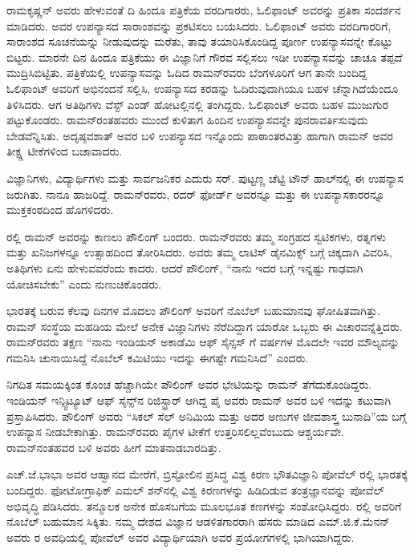 ರಾಮಕೃಷ್ಣನ್ ಅವರು ಹೇಳುವಂತೆ ದಿ ಹಿಂದೂ ಪತ್ರಿಕೆಯ ವರದಿಗಾರರು, ಓಲಿಫಾಂಟ್ ಅವರನ್ನು ಪ್ರತಿಕಾ ಸಂದರ್ಶನ ಮಾಡಿದರು. ಅವರ ಉಪನ್ಯಾಸದ ಸಾರಾಂಶವನ್ನು ಪ್ರಕಟಿಸಲು ಬಯಸಿದರು. ಓಲಿಫಾಂಟ್ ಅವರು ವರದಿಗಾರರಿಗೆ, ಸಾರಾಂಶದ ಸೂಚನೆಯನ್ನು ನೀಡುವುದನ್ನು ಮರೆತು, ತಾವು ತಯಾರಿಸಿಕೊಂಡಿದ್ದ ಪೂರ್ಣ ಉಪನ್ಯಾಸವನ್ನೇ ಕೊಟ್ಟು ಬಿಟ್ಟರು. ಮಾರನೇ ದಿನ ಹಿಂದೂ ಪತ್ರಿಕೆಯು ಈ ವಿಜ್ಞಾನಿಗೆ ಗೌರವ ಸಲ್ಲಿಸಲು ಇಡೀ ಉಪನ್ಯಾಸವನ್ನು ಚಾಚೂ ತಪ್ಪದೆ ಮುದ್ರಿಸಿಬಿಟ್ಟಿತು. ಪತ್ರಿಕೆಯಲ್ಲಿ ಉಪನ್ಯಾಸವನ್ನು ಓದಿದ ರಾಮನ್‍ರವರು ಬೆಂಗಳೂರಿಗೆ ಆಗ ತಾನೇ ಬಂದಿದ್ದ ಓಲಿಫಾಂಟ್ ಅವರಿಗೆ ಅಭಿನಂದನೆ ಸಲ್ಲಿಸಿ, ಉಪನ್ಯಾಸದ ಕರಡನ್ನು ಓದಿರುವುದಾಗಿಯೂ ಬಹಳ ಚೆನ್ನಾಗಿದೆಯೆಂದೂ ತಿಳಿಸಿದರು. ಆಗ ಅತಿಥಿಗಳು ವೆಸ್ಟ್ ಎಂಡ್ ಹೋಟಲ್ಲಿನಲ್ಲಿ ತಂಗಿದ್ದರು. ಓಲಿಫಾಂಟ್ ಅವರು ಬಹಳ ಮುಜುಗುರ ಪಟ್ಟುಕೊಂಡರು. ರಾಮನ್‍ರಂತಹವರು ಮುಂದೆ ಕುಳಿತಾಗ ಹಿಂದಿನ ಉಪನ್ಯಾಸವನ್ನೇ ಪುನರಾವರ್ತಿಸುವುದು ಬೇಡವೆನ್ನಿಸಿತು. ಅದೃಷ್ಠವಶಾತ್ ಅವರ ಬಳಿ ಉಪನ್ಯಾಸದ ಇನ್ನೊಂದು ಪಾಠಾಂತರವಿತ್ತು ಹಾಗಾಗಿ ರಾಮನ್ ಅವರ ತೀಕ್ಷ್ಣ ಟೀಕೆಗಳಿಂದ ಬಚಾವಾದರು.

ವಿಜ್ಞಾನಿಗಳು, ವಿದ್ಯಾರ್ಥಿಗಳು ಮತ್ತು ಸಾರ್ವಜನಿಕರ ಎದುರು ಸರ್. ಪುಟ್ಟಣ್ಣ ಚೆಟ್ಟಿ ಟೌನ್ ಹಾಲ್‍ನಲ್ಲಿ ಈ ಉಪನ್ಯಾಸ ಜರುಗಿತು. ನಾನೂ ಹಾಜರಿದ್ದೆ. ರಾಮನ್‍ರವರು, ರದರ್ ಫೋರ್ಡ್ ಅವರನ್ನೂ ಮತ್ತು ಈ ಉಪನ್ಯಾಸಕಾರರನ್ನೂ ಮುಕ್ತಕಂಠದಿಂದ ಹೊಗಳಿದರು.



ರಲ್ಲಿ ರಾಮನ್ ಅವರನ್ನು ಕಾಣಲು ಪೌಲಿಂಗ್ ಬಂದರು. ರಾಮನ್‍ರವರು ತಮ್ಮ ಸಂಗ್ರಹದ ಸ್ವಟಿಕಗಳು, ರತ್ನಗಳು ಮತ್ತು ಖನಿಜಗಳನ್ನೂ ಉತ್ಸಾಹದಿಂದ ತೋರಿಸಿದರು. ಅವರು ತಮ್ಮ ಲಾಟಿಸ್ ಡೈನಮಿಕ್ಸ್ ಬಗ್ಗೆ ಚಿಕ್ಕದಾಗಿ ವಿವರಿಸಿ, ಅತಿಥಿಗಳು ಏನು ಹೇಳುವವರೆಂದು ಕಾದರು. ಆದರೆ ಪೌಲಿಂಗ್, “ನಾನು ಇದರ ಬಗ್ಗೆ ಇನ್ನಷ್ಟು ಗಾಢವಾಗಿ ಯೋಚಿಸಬೇಕು” ಎಂದು ನುಣುಚಿಕೊಂಡರು.

\newpage

ಭಾರತಕ್ಕೆ ಬರುವ ಕೆಲವು ದಿನಗಳ ಮೊದಲು ಪೌಲಿಂಗ್ ಅವರಿಗೆ ನೊಬೆಲ್ ಬಹುಮಾನವು ಘೋಷಿತವಾಗಿತ್ತು. ರಾಮನ್ ಸಂಸ್ಥೆಯ ಮಹಡಿಯ ಮೇಲೆ ಅನೇಕ ವಿಜ್ಞಾನಿಗಳು ನೆರೆದಿದ್ದಾಗ ಯಾರೋ ಒಬ್ಬರು ಈ ವಿಚಾರವನ್ನೆತ್ತಿದರು. ರಾಮನ್‍ರವರು ತಕ್ಷಣ “ನಾನು ಇಂಡಿಯನ್ ಅಕಾಡೆಮಿ ಆಫ್ ಸೈನ್ಸಸ್ ಗೆ ವರ್ಷಗಳ ಮೊದಲೇ ಇವರ ಮೌಲ್ಯವನ್ನು ಗಮನಿಸಿ ಚುನಾಯಿಸಿದ್ದೆ ನೊಬೆಲ್ ಕಮಿಟಿಯು ಇದನ್ನು ಈಗಷ್ಟೇ ಗಮನಿಸಿದೆ” ಎಂದರು.

ನಿಗದಿತ ಸಮಯಕ್ಕಿಂತ ಕೊಂಚ ಹೆಚ್ಚಾಗಿಯೇ ಪೌಲಿಂಗ್ ಅವರ ಭೇಟಿಯನ್ನು ರಾಮನ್ ತೆಗೆದುಕೊಂಡಿದ್ದರು. ಇಂಡಿಯನ್ ಇನ್ಸ್ಟಿಟ್ಯೂಟ್ ಆಫ್ ಸೈನ್ಸ್‌ನ ರಿಜಿಸ್ಟ್ರಾರ್ ಆಗಿದ್ದ ಪೈ ಅವರು ರಾಮನ್ ಅವರ ಬಳಿ ಇದನ್ನು ಕಟುವಾಗಿ ಪ್ರಸ್ತಾಪಿಸಿದರು. ಪೌಲಿಂಗ್ ಅವರು “ಸಿಕಲ್ ಸೆಲ್ ಅನಿಮಿಯ ಮತ್ತು ಅದರ ಅಣುಗಳ ಜೀವಶಾಸ್ತ್ರ ಬುನಾದಿ”ಯ ಬಗ್ಗೆ ಉಪನ್ಯಾಸ ನೀಡಬೇಕಾಗಿತ್ತು. ರಾಮನ್‍ರವರು ಪೈಗಳ ಟೀಕೆಗೆ ಉತ್ತರಿಸಲಿಲ್ಲವೆಂಬುದು ಆಶ್ಚರ್ಯವೇ. ರಾಮನ್‍ನಂತಹವರ ಬಳಿ ಅವರು ಹೀಗೆ ಮಾತನಾಡಬಾರದಿತ್ತು.



ಎಚ್.ಜೆ.ಭಾಭಾ ಅವರ ಆಹ್ವಾನದ ಮೇರೆಗೆ, ಬ್ರಿಸ್ಟೋಲಿನ ಪ್ರಸಿದ್ಧ ವಿಶ್ವ ಕಿರಣ ಭೌತವಿಜ್ಞಾನಿ ಪೋವೆಲ್ ರಲ್ಲಿ ಭಾರತಕ್ಕೆ ಬಂದಿದ್ದರು. ಫೋಟೋಗ್ರಾಫಿಕ್ ಎಮಲ್ ಶನ್‍ನಲ್ಲಿ ವಿಶ್ವ ಕಿರಣಗಳನ್ನು ಹಿಡಿದಿಡುವ ತಂತ್ರಜ್ಞಾನವನ್ನು ಪೋವೆಲ್ ಅಭಿವೃದ್ಧಿ ಪಡಿಸಿದರು. ತನ್ಮೂಲಕ ಅನೇಕ ಹೊಸಬಗೆಯ ಮೂಲಭೂತ ಕಣಗಳನ್ನು ಸಂಶೋಧಿಸಿದ್ದರು. ರಲ್ಲಿ ಅವರಿಗೆ ನೊಬೆಲ್ ಬಹುಮಾನ ಸಿಕ್ಕಿತು. ನಮ್ಮ ದೇಶದ ವಿಜ್ಞಾನ ಆಡಳಿತಗಾರರಾಗಿ ಹೆಸರು ಮಾಡಿದ ಎಮ್.ಜಿ.ಕೆ.ಮೆನನ್ ಅವರು ರ ಅವಧಿಯಲ್ಲಿ ಪೋವೆಲ್ ಅವರ ವಿದ್ಯಾರ್ಥಿಯಾಗಿ ಅವರ ಪ್ರಯೋಗಗಳಲ್ಲಿ ಭಾಗಿಯಾಗಿದ್ದರು.

